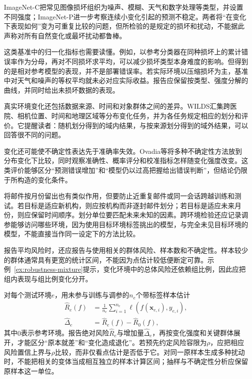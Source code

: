ImageNet-C把常见图像损坏组织为噪声、模糊、天气和数字处理等类型，并设置不同强度；ImageNet-P进一步考察连续小变化引起的预测不稳定。两者将“在变化下表现如何”变为可重复比较的问题，但所检验的是规定的损坏和扰动，不能据此声称对所有自然变化或最坏扰动都鲁棒。

这类基准中的归一化指标也需要读懂。例如，以参考分类器在同种损坏上的累计错误率作为分母，再对不同损坏求平均，可以减少损坏类型本身难度的影响。但得到的是相对参考模型的表现，并不是部署错误率。若实际环境以压缩损坏为主，基准中对天气和噪声的等权平均就未必对应实际收益。报告应保留按类型、强度分解的曲线，并同时给出未损坏数据的表现。

真实环境变化还包括数据来源、时间和对象群体之间的差异。WILDS汇集跨医院、相机位置、时间和地理区域等分布变化任务，并为各任务规定相应的划分和评价。它提醒读者：随机划分得到的域内结果，与按来源划分得到的域外结果，可以回答很不同的问题。

\Needspace{45mm}
变化还可能使不确定性表达先于准确率失效。Ovadia等将多种不确定性方法放到分布变化下比较，同时观察准确性、概率评分和校准指标怎样随变化强度改变。这类评价能够区分“预测错误增加”和“模型仍以过高把握给出错误判断”，但结论仍限于所构造的变化条件。

将邮件按月份留出也有类似作用，但要防止近重复邮件或同一会话跨越训练和测试。若目标是适应新机构，则应按机构而非逐封邮件划分；若目标是适应未来月份，则应保留时间顺序。划分单位要匹配未来未知的因素。跨环境检验还应记录调参能够访问哪些环境，因为使用目标环境标签挑出的模型，与完全未见目标环境的模型，不能直接当作同一设定下的方法比较。

报告平均风险时，还应报告与使用相关的群体风险、样本数和不确定性。样本较少的群体通常具有更宽的统计区间，不能因为点估计较低便断定可靠。示例~\ref{ex:robustness-mixture}提示，变化环境中的总体风险还依赖组比例，因此应把组内表现与组比例变化分开。

对每个测试环境$e$，用未参与训练与调参的$n_e$个带标签样本估计
\begin{equation}
 \begin{aligned}
 \widehat R_e(f)&=\frac{1}{n_e}\sum_{i=1}^{n_e}
       \ell(f(\bm{x}_{e,i}),y_{e,i}),\\
 \widehat\Delta_e&=\widehat R_e(f)-\widehat R_0(f),
 \end{aligned}
 \label{eq:robustness-environment-test}
\end{equation}
其中$0$表示参考环境。报告绝对风险$\widehat R_e$与增加量$\widehat\Delta_e$，再按变化强度和关键群体展开，才能区分“原本就差”和“变化造成退化”。若预先约定风险容限为$\rho$，应把相应风险置信上界与$\rho$比较，而非仅看点估计是否低于它。对同一原样本生成多种扰动时，不能把相关的变体当成相互独立的样本计算区间；抽样与不确定性分析应保留原样本这一单位。

